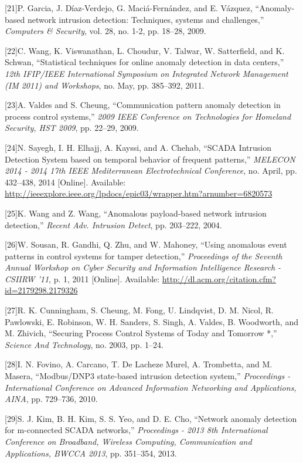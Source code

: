 \documentclass[11pt,]{article}
\begin{document}
{[}21{]}P. Garcia, J. Díaz-Verdejo, G. Maciá-Fernández, and E. Vázquez,
``Anomaly-based network intrusion detection: Techniques, systems and
challenges,'' \emph{Computers \& Security}, vol. 28, no. 1-2, pp.
18--28, 2009.

{[}22{]}C. Wang, K. Viswanathan, L. Choudur, V. Talwar, W. Satterfield,
and K. Schwan, ``Statistical techniques for online anomaly detection in
data centers,'' \emph{12th IFIP/IEEE International Symposium on
Integrated Network Management (IM 2011) and Workshops}, no. May, pp.
385--392, 2011.

{[}23{]}A. Valdes and S. Cheung, ``Communication pattern anomaly
detection in process control systems,'' \emph{2009 IEEE Conference on
Technologies for Homeland Security, HST 2009}, pp. 22--29, 2009.

{[}24{]}N. Sayegh, I. H. Elhajj, A. Kayssi, and A. Chehab, ``SCADA
Intrusion Detection System based on temporal behavior of frequent
patterns,'' \emph{MELECON 2014 - 2014 17th IEEE Mediterranean
Electrotechnical Conference}, no. April, pp. 432--438, 2014
{[}Online{]}. Available:
\url{http://ieeexplore.ieee.org/lpdocs/epic03/wrapper.htm?arnumber=6820573}

{[}25{]}K. Wang and Z. Wang, ``Anomalous payload-based network intrusion
detection,'' \emph{Recent Adv. Intrusion Detect}, pp. 203--222, 2004.

{[}26{]}W. Sousan, R. Gandhi, Q. Zhu, and W. Mahoney, ``Using anomalous
event patterns in control systems for tamper detection,''
\emph{Proceedings of the Seventh Annual Workshop on Cyber Security and
Information Intelligence Research - CSIIRW '11}, p. 1, 2011
{[}Online{]}. Available:
\url{http://dl.acm.org/citation.cfm?id=2179298.2179326}

{[}27{]}R. K. Cunningham, S. Cheung, M. Fong, U. Lindqvist, D. M. Nicol,
R. Pawlowski, E. Robinson, W. H. Sanders, S. Singh, A. Valdes, B.
Woodworth, and M. Zhivich, ``Securing Process Control Systems of Today
and Tomorrow *,'' \emph{Science And Technology}, no. 2003, pp. 1--24.

{[}28{]}I. N. Fovino, A. Carcano, T. {De Lacheze Murel}, A. Trombetta,
and M. Masera, ``Modbus/DNP3 state-based intrusion detection system,''
\emph{Proceedings - International Conference on Advanced Information
Networking and Applications, AINA}, pp. 729--736, 2010.

{[}29{]}S. J. Kim, B. H. Kim, S. S. Yeo, and D. E. Cho, ``Network
anomaly detection for m-connected SCADA networks,'' \emph{Proceedings -
2013 8th International Conference on Broadband, Wireless Computing,
Communication and Applications, BWCCA 2013}, pp. 351--354, 2013.
\end{document}
